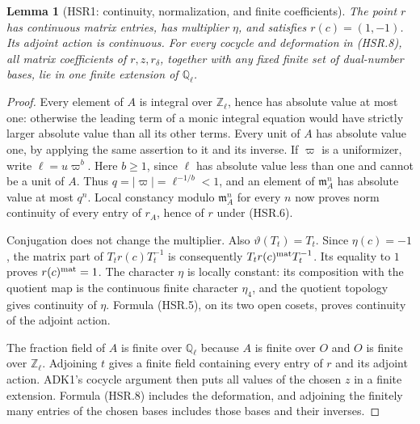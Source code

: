 \documentclass[11pt,a4paper]{article}
\numberwithin{equation}{section}
\newtheorem{lemma}[theorem]{Lemma}
\theoremstyle{remark}\newtheorem{remark}[theorem]{Remark}
\begin{document}
\begin{lemma}[HSR1: continuity, normalization, and finite coefficients]
\label{claim:HSR1}
The point $r$ has continuous matrix entries, has multiplier $\eta$,
and satisfies $r(c)=(1,-1)$.  Its adjoint action is continuous.
For every cocycle and deformation in (HSR.8), all matrix coefficients
of $r,\allowbreak{} z,\allowbreak{} r_\delta$, together with any fixed finite set of dual-number
bases, lie in one finite extension of $\mathbb Q_\ell$.
\end{lemma}
\begin{proof}
Every element of $A$ is integral over $\mathbb Z_\ell$, hence has
absolute value at most one: otherwise the leading term of a monic
integral equation would have strictly larger absolute value than
all its other terms.  Every unit of $A$ has absolute value one,
by applying the same assertion to it and its inverse.  If $\varpi$
is a uniformizer, write $\ell=u\varpi^b$.  Here $b\ge1$, since
$\ell$ has absolute value less than one and cannot be a unit of
$A$.  Thus $q=|\varpi|=\ell^{-1/b}<1$, and an element of
$\mathfrak m_A^n$ has absolute value at most $q^n$.  Local constancy
modulo $\mathfrak m_A^n$ for every $n$ now proves norm continuity
of every entry of $r_A$, hence of $r$ under (HSR.6).

Conjugation does not change the multiplier.  Also
$\vartheta(T_t)=T_t$.  Since $\eta(c)=-1$, the matrix part of
$T_t r(c)T_t^{-1}$ is consequently
$T_t r(c)^{\rm mat}T_t^{-1}$.  Its equality to $1$ proves
$r(c)^{\rm mat}=1$.  The character $\eta$ is locally constant:
its composition with the quotient map is the continuous finite
character $\eta_4$, and the quotient topology gives continuity of
$\eta$.  Formula (HSR.5), on its two open cosets, proves continuity
of the adjoint action.

The fraction field of $A$ is finite over $\mathbb Q_\ell$ because
$A$ is finite over $O$ and $O$ is finite over $\mathbb Z_\ell$.
Adjoining $t$ gives a finite field containing every entry of $r$ and
its adjoint action.  ADK1's cocycle argument then puts all values of
the chosen $z$ in a finite extension.  Formula (HSR.8) includes the
deformation, and adjoining the finitely many entries of the chosen
bases includes those bases and their inverses.


\end{proof}
\end{document}
